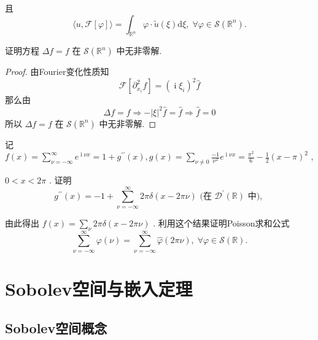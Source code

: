 \documentclass[lang=cn,newtx,10pt,scheme=chinese,thmcnt=chapter]{elegantbook}
\newcommand{\dif}{\mathrm{d}}
\newcommand{\ci}{\operatorname{i}}
\begin{document}
\begin{problemset}
且
\begin{equation*}
\langle u,\mathcal{F}\left\lbrack  \varphi \right\rbrack  \rangle  = {\int }_{{\mathbb{R}}^{n}}\varphi  \cdot  \widetilde{u}\left( \xi \right) {\dif\xi },\;\forall \varphi  \in  \mathcal{S}\left( {\mathbb{R}}^{n}\right) .
\end{equation*}

\item 证明方程 \({\Delta f} = f\) 在 \({\mathcal{S}}\left( {\mathbb{R}}^{n}\right)\) 中无非零解.
\begin{proof}
    由Fourier变化性质知\[
    \mathcal{F}[\partial^2_{x_i}f ]=(\ci\xi_i )^2\hat{f}
    \]
    那么由\[
    \Delta f=f\Rightarrow -|\xi|^2\hat{f}=\hat{f}\Rightarrow \hat{f}=0\]
    所以 \({\Delta f} = f\) 在 \({\mathcal{S}}\left( {\mathbb{R}}^{n}\right)\) 中无非零解.
\end{proof}
\item 记 \(f\left( x\right)  = \mathop{\sum }\limits_{{\nu  =  - \infty }}^{\infty }{e}^{\ci\nu x} = 1 + {g}^{\prime \prime }\left( x\right) ,g\left( x\right)  = \mathop{\sum }\limits_{{\nu  \neq  0}}\frac{-1}{{\nu }^{2}}{e}^{\ci\nu x} = \frac{{\pi }^{2}}{6} - \frac{1}{2}{\left( x - \pi \right) }^{2}\) ,

\(0 < x < {2\pi }\) . 证明
\begin{equation*}
{g}^{\prime \prime }\left( x\right)  =  - 1 + \mathop{\sum }\limits_{{\nu  =  - \infty }}^{\infty }{2\pi \delta }\left( {x - {2\pi \nu }}\right) \text{ (在 }{\mathcal{D}}^{\prime }\left( \mathbb{R}\right) \text{ 中), }
\end{equation*}

由此得出 \(f\left( x\right)  = \mathop{\sum }\limits_{\nu }{2\pi \delta }\left( {x - {2\pi \nu }}\right)\) . 利用这个结果证明Poisson求和公式
\begin{equation*}
\mathop{\sum }\limits_{{\nu  =  - \infty }}^{\infty }\varphi \left( \nu \right)  = \mathop{\sum }\limits_{{\nu  =  - \infty }}^{\infty }\widehat{\varphi }\left( {2\pi \nu }\right) ,\;\forall \varphi  \in  \mathcal{S}\left( \mathbb{R}\right) .
\end{equation*}


\end{problemset}


\section{Sobolev空间与嵌入定理}

\subsection{Sobolev空间概念}
\end{document}
